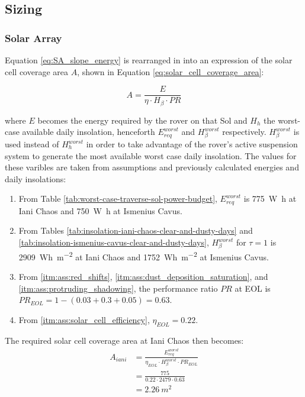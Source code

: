 
\subsection{Sizing}

\subsubsection{Solar Array}
Equation \ref{eq:SA_slope_energy} is rearranged in into an expression of the solar cell coverage area $A$, shown in Equation \ref{eq:solar_cell_coverage_area}:

\begin{equation}
  \label{eq:solar_cell_coverage_area}
  A = \frac{E}{\eta \cdot H_{\beta} \cdot PR}
\end{equation}

where $E$ becomes the energy required by the rover on that Sol and $H_{h}$ the worst-case available daily insolation, henceforth $E_{req}^{worst}$ and $H_{\beta}^{worst}$ respectively. $H_{\beta}^{worst}$ is used instead of $H_{h}^{worst}$ in order to take advantage of the rover's active suspension system to generate the most available worst case daily insolation. The values for these varibles are taken from assumptions and previously calculated energies and daily insolations:

\begin{enumerate}[label=\textbf{\textcolor{BulletBlue}{(\alph*)}}]
    \item From Table \ref{tab:worst-case-traverse-sol-power-budget}, $E_{req}^{worst}$ is \SI{775}{\watt\hour} at Iani Chaos and \SI{750}{\watt\hour} at Ismenius Cavus.
    \item From Tables \ref{tab:insolation-iani-chaos-clear-and-dusty-days} and \ref{tab:insolation-ismenius-cavus-clear-and-dusty-days}, $H_{\beta}^{worst}$ for $\tau=1$ is \SI{2909}{Wh.m^{-2}} at Iani Chaos and \SI{1752}{Wh.m^{-2}} at Ismenius Cavus.
    \item From \ref{itm:ass:red_shifts}, \ref{itm:ass:dust_deposition_saturation}, and \ref{itm:ass:protruding_shadowing}, the performance ratio $PR$ at \ac{EOL} is $PR_{EOL} = 1 - (0.03 + 0.3 + 0.05) = 0.63$.
    \item From \ref{itm:ass:solar_cell_efficiency}, $\eta_{EOL} = 0.22$.
\end{enumerate}


The required solar cell coverage area at Iani Chaos then becomes:
\begin{align}
  \label{calc:solar_cell_area_ismenius_cavus}
  A_{iani} &= \frac{E_{req}^{worst}}{\eta_{EOL} \cdot H_{\beta}^{worst} \cdot PR_{EOL}}\\
           &= \frac{775}{0.22 \cdot 2479 \cdot 0.63}\\
           &= \SI{2.26}{m^{2}}
\end{align}

